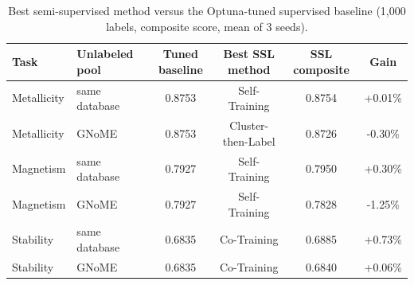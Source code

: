 \begin{table}[H]
\centering\small
\begin{tabular}{llcccc}
\toprule
Task & Unlabeled pool & Tuned baseline & Best SSL method & SSL composite & Gain\\
\midrule
Metallicity & same database & 0.8753 & Self-Training & 0.8754 & +0.01\% \\
Metallicity & GNoME & 0.8753 & Cluster-then-Label & 0.8726 & -0.30\% \\
Magnetism & same database & 0.7927 & Self-Training & 0.7950 & +0.30\% \\
Magnetism & GNoME & 0.7927 & Self-Training & 0.7828 & -1.25\% \\
Stability & same database & 0.6835 & Co-Training & 0.6885 & +0.73\% \\
Stability & GNoME & 0.6835 & Co-Training & 0.6840 & +0.06\% \\
\bottomrule
\end{tabular}
\caption{Best semi-supervised method versus the Optuna-tuned supervised baseline (1,000 labels, composite score, mean of 3 seeds).}\label{tab:ssl-overview}
\end{table}
